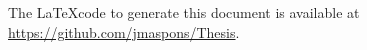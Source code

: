 \documentclass[12pt,a4paper,twoside,fleqn]{memoir}
\begin{document}
\bigskip

The \LaTeX code to generate this document is available at
\url{https://github.com/jmaspons/Thesis}.




\cleardoublepage %



\tableofcontents* %

\clearpage


\listoffigures %



\listoftables %






%
\end{document}
